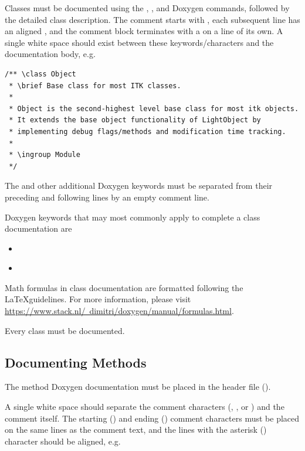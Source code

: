 Classes must be documented using the ,
, and
 Doxygen commands, followed by the detailed class description.
The comment starts with \code{/**}, each subsequent line has an aligned
\code{*}, and the comment block terminates with a \code{*/} on a line of its
own. A single white space should exist between these keywords/characters and
the documentation body, e.g.

\small
\begin{verbatim}
/** \class Object
 * \brief Base class for most ITK classes.
 *
 * Object is the second-highest level base class for most itk objects.
 * It extends the base object functionality of LightObject by
 * implementing debug flags/methods and modification time tracking.
 *
 * \ingroup Module
 */
\end{verbatim}
\normalsize

The  and other additional Doxygen keywords must be separated from
their preceding and following lines by an empty comment \code{*} line.

Doxygen keywords that may most commonly apply to complete a class documentation are
\begin{itemize}
  \item \textbf{}
  \item \textbf{}
\end{itemize}

Math formulas in class documentation are formatted following the \LaTeX guidelines.
For more information, please visit
\href{https://www.stack.nl/~dimitri/doxygen/manual/formulas.html}
{https://www.stack.nl/~dimitri/doxygen/manual/formulas.html}.

Every class must be documented.


\subsection{Documenting Methods}%
\label{subsec:DocumentingMethods}

The method Doxygen documentation must be placed in the header file ().

A single white space should separate the comment characters (\code{/**},
\code{*}, or \code{*/}) and the comment itself. The starting (\code{/**})
and ending (\code{*/}) comment characters must be placed on the same lines
as the comment text, and the lines with the asterisk (\code{*}) character
should be aligned, e.g.

